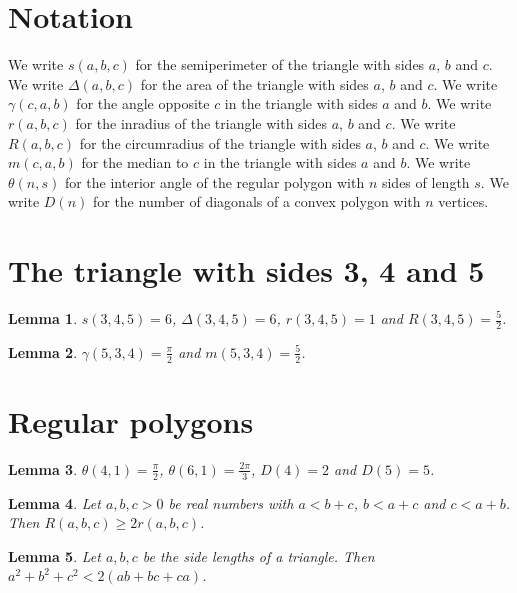 \documentclass{article}
\newtheorem{lemma}{Lemma}
\begin{document}
\section{Notation}

We write $s(a,b,c)$ for the semiperimeter of the triangle with sides $a$, $b$ and $c$.
We write $\Delta(a,b,c)$ for the area of the triangle with sides $a$, $b$ and $c$.
We write $\gamma(c,a,b)$ for the angle opposite $c$ in the triangle with sides $a$ and $b$.
We write $r(a,b,c)$ for the inradius of the triangle with sides $a$, $b$ and $c$.
We write $R(a,b,c)$ for the circumradius of the triangle with sides $a$, $b$ and $c$.
We write $m(c,a,b)$ for the median to $c$ in the triangle with sides $a$ and $b$.
We write $\theta(n,s)$ for the interior angle of the regular polygon with $n$ sides of length $s$.
We write $D(n)$ for the number of diagonals of a convex polygon with $n$ vertices.

\section{The triangle with sides 3, 4 and 5}

\begin{lemma}\label{pythagorean}
$s(3,4,5)=6$, $\Delta(3,4,5)=6$, $r(3,4,5)=1$ and $R(3,4,5)=\frac52$.
\end{lemma}

\begin{lemma}\label{right}
$\gamma(5,3,4)=\frac{\pi}{2}$ and $m(5,3,4)=\frac52$.
\end{lemma}

\section{Regular polygons}

\begin{lemma}\label{polygons}
$\theta(4,1)=\frac{\pi}{2}$, $\theta(6,1)=\frac{2\pi}{3}$, $D(4)=2$ and $D(5)=5$.
\end{lemma}

\begin{lemma}\label{euler}
Let $a,b,c>0$ be real numbers with $a<b+c$, $b<a+c$ and $c<a+b$. Then $R(a,b,c)\ge2r(a,b,c)$.
\end{lemma}

\begin{lemma}\label{side-lengths}
Let $a,b,c$ be the side lengths of a triangle. Then $a^2+b^2+c^2<2(ab+bc+ca)$.
\end{lemma}
\end{document}
